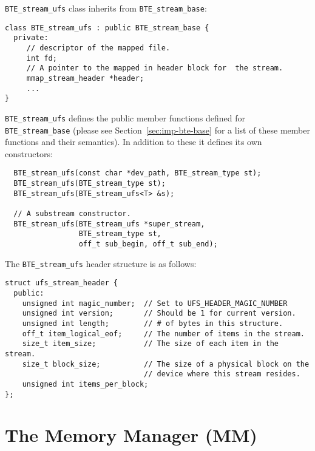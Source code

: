 \lstinline|BTE_stream_ufs| class inherits from
\lstinline|BTE_stream_base|:
\begin{lstlisting}
class BTE_stream_ufs : public BTE_stream_base { 
  private:
     // descriptor of the mapped file.  
     int fd;
     // A pointer to the mapped in header block for  the stream.  
     mmap_stream_header *header; 
     ...  
}
\end{lstlisting}

\lstinline|BTE_stream_ufs| defines the public member
functions defined for \lstinline|BTE_stream_base| (please see
Section~\ref{sec:imp-bte-base} for a list of these member
functions and their semantics).  In addition to these it
defines its own constructors: 

\begin{lstlisting}
  BTE_stream_ufs(const char *dev_path, BTE_stream_type st); 
  BTE_stream_ufs(BTE_stream_type st); 
  BTE_stream_ufs(BTE_stream_ufs<T> &s); 
  
  // A substream constructor.
  BTE_stream_ufs(BTE_stream_ufs *super_stream,
                 BTE_stream_type st,
                 off_t sub_begin, off_t sub_end);
\end{lstlisting}
The \lstinline|BTE_stream_ufs| header structure is as follows:
\begin{lstlisting}
struct ufs_stream_header { 
  public:
    unsigned int magic_number;  // Set to UFS_HEADER_MAGIC_NUMBER
    unsigned int version;       // Should be 1 for current version.
    unsigned int length;        // # of bytes in this structure.
    off_t item_logical_eof;     // The number of items in the stream.
    size_t item_size;           // The size of each item in the stream.
    size_t block_size;          // The size of a physical block on the
                                // device where this stream resides.
    unsigned int items_per_block;
};
\end{lstlisting}




\section{The Memory Manager (MM)}

